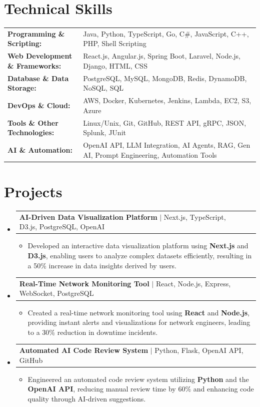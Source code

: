 \documentclass[letterpaper,10pt]{article}
\makeatletter
\newcommand{\resumeItem}[1]{
  \item{\fontsize{8pt}{9pt}\selectfont
    #1 \vspace{-3pt}
  }
}
\newcommand{\resumeProjectHeading}[2]{
    \item
    \begin{tabular*}{1.001\textwidth}{l@{\extracolsep{\fill}}r}
      \fontsize{8.5pt}{10pt}#1 & \textbf{\fontsize{8.5pt}{10pt} #2}\\
    \end{tabular*}\vspace{-7pt}
}
\newcommand{\resumeSubHeadingListStart}{\begin{itemize}[leftmargin=0pt, label={}]}
\newcommand{\resumeSubHeadingListEnd}{\end{itemize}}
\newcommand{\resumeItemListStart}{\begin{itemize}[leftmargin=*]}
\newcommand{\resumeItemListEnd}{\end{itemize}\vspace{-5pt}}
\makeatother
\begin{document}
\section{Technical Skills}
        \vspace{-14pt}
        \begin{table}[h]
            \fontsize{8pt}{9pt}\selectfont
            \begin{tabular}{p{0.3\linewidth} p{0.7\linewidth}}
                \textbf{Programming \& Scripting:} & Java, Python, TypeScript, Go, C\#, JavaScript, C++, PHP, Shell Scripting \\
                \textbf{Web Development \& Frameworks:} & React.js, Angular.js, Spring Boot, Laravel, Node.js, Django, HTML, CSS \\
                \textbf{Database \& Data Storage:} & PostgreSQL, MySQL, MongoDB, Redis, DynamoDB, NoSQL, SQL \\
                \textbf{DevOps \& Cloud:} & AWS, Docker, Kubernetes, Jenkins, Lambda, EC2, S3, Azure \\
                \textbf{Tools \& Other Technologies:} & Linux/Unix, Git, GitHub, REST API, gRPC, JSON, Splunk, JUnit \\
                \textbf{AI \& Automation:} & OpenAI API, LLM Integration, AI Agents, RAG, Gen AI, Prompt Engineering, Automation Tools \\
            \end{tabular}
        \end{table}
 \vspace{-18pt}

\section{Projects}
    \vspace{-5pt}
    \resumeSubHeadingListStart
          \resumeProjectHeading
            {\textbf{AI-Driven Data Visualization Platform} $|$ Next.js, TypeScript, D3.js, PostgreSQL, OpenAI}{}
            \resumeItemListStart
                \resumeItem{Developed an interactive data visualization platform using \textbf{Next.js} and \textbf{D3.js}, enabling users to analyze complex datasets efficiently, resulting in a 50\% increase in data insights derived by users.}
            \resumeItemListEnd
        \vspace{-12pt}
    
        \resumeProjectHeading
            {\textbf{Real-Time Network Monitoring Tool} $|$ React, Node.js, Express, WebSocket, PostgreSQL}{}
        \resumeItemListStart
                \resumeItem{Created a real-time network monitoring tool using \textbf{React} and \textbf{Node.js}, providing instant alerts and visualizations for network engineers, leading to a 30\% reduction in downtime incidents.}
        \resumeItemListEnd
      \vspace{-12pt}
      \resumeProjectHeading
        {\textbf{Automated AI Code Review System} $|$ Python, Flask, OpenAI API, GitHub}{}
    \resumeItemListStart
            \resumeItem{Engineered an automated code review system utilizing \textbf{Python} and the \textbf{OpenAI API}, reducing manual review time by 60\% and enhancing code quality through AI-driven suggestions.}
    \resumeItemListEnd
    \resumeSubHeadingListEnd
\end{document}
